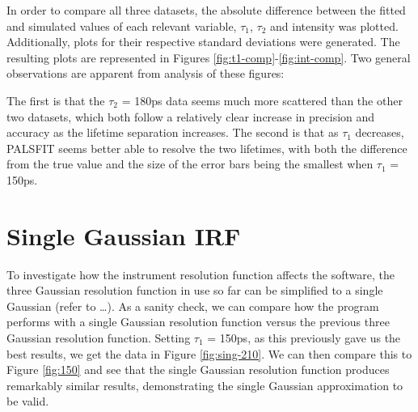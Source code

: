 In order to compare all three datasets, the absolute difference between the fitted and simulated values of each relevant variable, $\tau_1$, $\tau_2$ and intensity was plotted. Additionally, plots for their respective standard deviations were generated. The resulting plots are represented in Figures \ref{fig:t1-comp}-\ref{fig:int-comp}. Two general observations are apparent from analysis of these figures: 

The first is that the $\tau_2$ = 180ps data seems much more scattered than the other two datasets, which both follow a relatively clear increase in precision and accuracy as the lifetime separation increases. The second is that as $\tau_1$ decreases, PALSFIT seems better able to resolve the two lifetimes, with both the difference from the true value and the size of the error bars being the smallest when $\tau_1$ = 150ps.

\pagebreak

\section{Single Gaussian IRF}

To investigate how the instrument resolution function affects the software, the three Gaussian resolution function in use so far can be simplified to a single Gaussian (refer to \dots). As a sanity check, we can compare how the program 
performs with a single Gaussian resolution function versus the previous three Gaussian resolution function. Setting $\tau_1$ = 150ps, as this previously gave us the best results, we get the data in Figure \ref{fig:sing-210}. We can then compare this to Figure \ref{fig:150} and see that the single Gaussian resolution function produces remarkably similar results, demonstrating the single Gaussian approximation to be valid.

